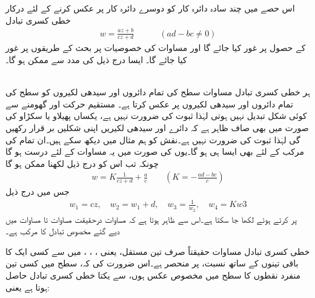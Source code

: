 اس حصے میں چند سادہ دائرہ کار کو دوسرے دائرہ کار پر عکس کرنے کے لئے درکار خطی کسری تبادل
\begin{align}\label{مساوات_نقش_مخصوص_کسری_الف}
w=\frac{az+b}{cz+d}\quad \quad \quad (ad-bc\ne 0)
\end{align}
کے حصول پر غور کیا جائے گا اور  مساوات  کی خصوصیات پر بحث کے طریقوں پر غور کیا جائے  گا۔ ایسا درج ذیل کی مدد سے ممکن ہو گا۔

\quad {}\\
ہر خطی کسری تبادل مساوات   سطح کی تمام دائروں اور سیدھی لکیروں کو  سطح کی تمام دائروں اور سیدھی لکیروں پر عکس کرتا ہے۔
\quad
مستقیم حرکت اور گھومنے سے کوئی شکل تبدیل نہیں ہوتی لہٰذا ثبوت کی ضرورت نہیں ہے، یکساں پھیلاو یا سکڑاو کی صورت میں بھی صاف ظاہر ہے کہ دائرے اور سیدھی لکیریں اپنی شکلیں بر قرار رکھیں گی لہٰذا ثبوت کی ضرورت نہیں ہے۔نقش  کو ہم مثال  میں دیکھ سکے ہیں۔ان تمام  کی مرکب کے لئے بھی ایسا ہی ہو گا۔یوں  کی صورت میں یہ مساوات  کے لئے درست ہو گا چونکہ تب اس کو درج ذیل لکھنا ممکن ہو گا
\begin{align}\label{مساوات_نقش_مرکب}
w=K\frac{1}{cz+d}+\frac{a}{c} \quad \quad (K=-\frac{ad-bc}{c})
\end{align}
جس میں درج ذیل
\begin{align*}
w_1=cz,\quad w_2=w_1+d,\quad w_3=\frac{1}{w_2},\quad w_4=Kw3
\end{align*}
پر کرتے ہوئے  لکھا جا سکتا ہے۔اس سے ظاہر ہوتا ہے کہ مساوات   درحقیقت مساوات  تا مساوات  میں دیے گئے  مخصوص تبادل کا مرکب ہے۔

خطی کسری تبادل مساوات  حقیقتاً صرف تین مستقل، یعنی ، ، ،  میں سے کسی ایک کا باقی تینوں کے ساتھ نسبت، پر منحصر ہے۔اس ضرورت کی کہ،  سطح میں کسی تین منفرد نقطوں کا  سطح میں مخصوص عکس ہوں، سے  یکتا خطی کسری تبادل حاصل ہوتا ہے یعنی:

